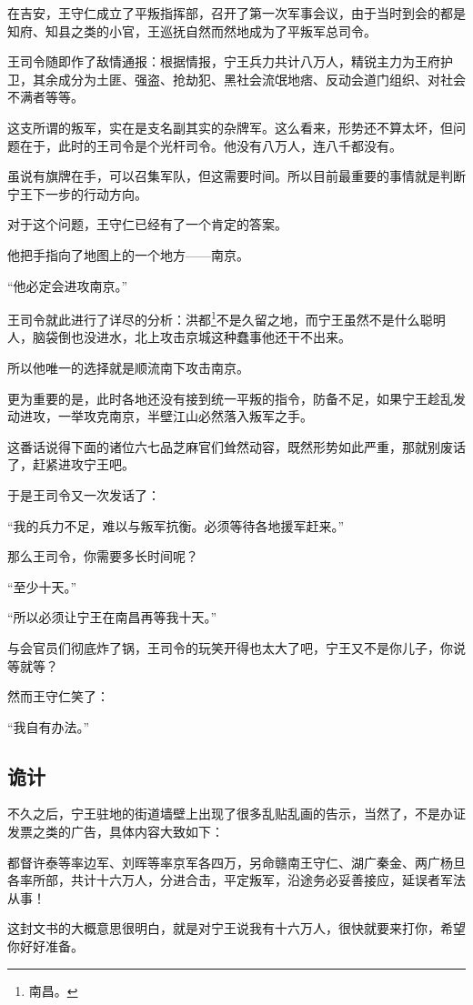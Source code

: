\begin{multicols}{\theparacolNo}
在吉安，王守仁成立了平叛指挥部，召开了第一次军事会议，由于当时到会的都是知府、知县之类的小官，王巡抚自然而然地成为了平叛军总司令。

王司令随即作了敌情通报：根据情报，宁王兵力共计八万人，精锐主力为王府护卫，其余成分为土匪、强盗、抢劫犯、黑社会流氓地痞、反动会道门组织、对社会不满者等等。

这支所谓的叛军，实在是支名副其实的杂牌军。这么看来，形势还不算太坏，但问题在于，此时的王司令是个光杆司令。他没有八万人，连八千都没有。

虽说有旗牌在手，可以召集军队，但这需要时间。所以目前最重要的事情就是判断宁王下一步的行动方向。

对于这个问题，王守仁已经有了一个肯定的答案。

他把手指向了地图上的一个地方——南京。

“他必定会进攻南京。”

王司令就此进行了详尽的分析：洪都\footnote{南昌。}不是久留之地，而宁王虽然不是什么聪明人，脑袋倒也没进水，北上攻击京城这种蠢事他还干不出来。

所以他唯一的选择就是顺流南下攻击南京。

更为重要的是，此时各地还没有接到统一平叛的指令，防备不足，如果宁王趁乱发动进攻，一举攻克南京，半壁江山必然落入叛军之手。

这番话说得下面的诸位六七品芝麻官们耸然动容，既然形势如此严重，那就别废话了，赶紧进攻宁王吧。

于是王司令又一次发话了：

“我的兵力不足，难以与叛军抗衡。必须等待各地援军赶来。”

那么王司令，你需要多长时间呢？

“至少十天。”

“所以必须让宁王在南昌再等我十天。”

与会官员们彻底炸了锅，王司令的玩笑开得也太大了吧，宁王又不是你儿子，你说等就等？

然而王守仁笑了：

“我自有办法。”

\subsection{诡计}
不久之后，宁王驻地的街道墙壁上出现了很多乱贴乱画的告示，当然了，不是办证发票之类的广告，具体内容大致如下：

都督许泰等率边军、刘晖等率京军各四万，另命赣南王守仁、湖广秦金、两广杨旦各率所部，共计十六万人，分进合击，平定叛军，沿途务必妥善接应，延误者军法从事！

这封文书的大概意思很明白，就是对宁王说我有十六万人，很快就要来打你，希望你好好准备。


\end{multicols}
